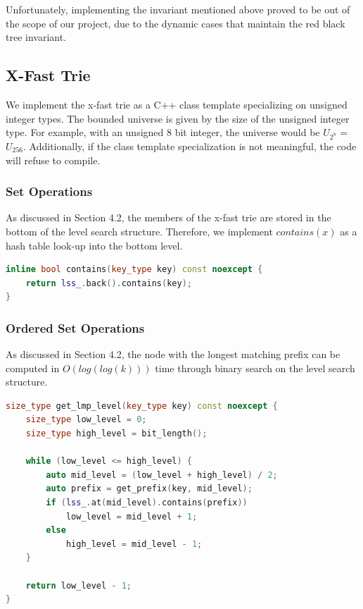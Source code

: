 \documentclass{article}
\begin{document}
\noindent
Unfortunately, implementing the invariant mentioned above proved to be out of the scope of our project, due to the dynamic cases that maintain the red black tree invariant.
\\

\subsection{X-Fast Trie}

\noindent
We implement the x-fast trie as a C++ class template specializing on unsigned integer types. The bounded universe is given by the size of the unsigned integer type. For example, with an unsigned 8 bit integer, the universe would be $U_{2^8}$ = $U_{256}$. Additionally, if the class template specialization is not meaningful, the code will refuse to compile.

\subsubsection{Set Operations}
As discussed in Section 4.2, the members of the x-fast trie are stored in the bottom of the level search structure. Therefore, we implement $contains(x)$ as a hash table look-up into the bottom level.

\begin{lstlisting}[language=C++,basicstyle=\small]
inline bool contains(key_type key) const noexcept {
	return lss_.back().contains(key);
}
\end{lstlisting}

\subsubsection{Ordered Set Operations}

\noindent
As discussed in Section 4.2, the node with the longest matching prefix can be computed in $O(log(log(k)))$ time through binary search on the level search structure.

\begin{lstlisting}[language=C++,basicstyle=\small]
size_type get_lmp_level(key_type key) const noexcept {
	size_type low_level = 0;
	size_type high_level = bit_length();

	while (low_level <= high_level) {
		auto mid_level = (low_level + high_level) / 2;
		auto prefix = get_prefix(key, mid_level);
		if (lss_.at(mid_level).contains(prefix)) 
			low_level = mid_level + 1;
		else 
			high_level = mid_level - 1;
	}

	return low_level - 1;
}
\end{lstlisting}
\end{document}
